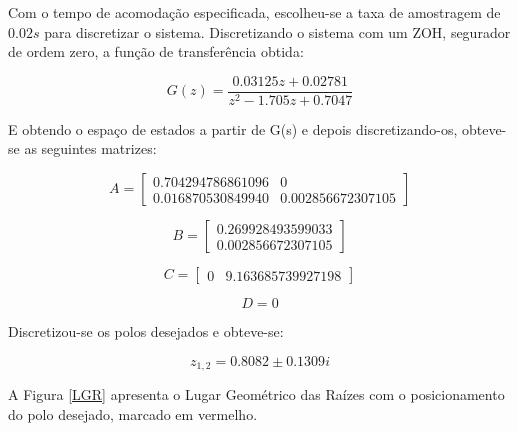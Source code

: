 \documentclass[conference,harvard,brazil,english]{sbatex}
\begin{document}
            Com o tempo de acomodação especificada, escolheu-se a taxa de amostragem de $0.02s$ para discretizar o sistema. Discretizando o sistema com um ZOH, segurador de ordem zero, a função de transferência obtida:
                
            \begin{equation}
                G(z) = \frac{0.03125 z + 0.02781}{z^2 - 1.705 z + 0.7047}
            \end{equation}
            
            E obtendo o espaço de estados a partir de G(s) e depois discretizando-os, obteve-se as seguintes matrizes:

            \begin{equation}
                A =
                \begin{bmatrix} 0.704294786861096 & 0
                            \\  0.016870530849940 & 0.002856672307105
                \end{bmatrix}
            \end{equation}
            
            \begin{equation}
                B = 
                \begin{bmatrix} 0.269928493599033
                            \\  0.002856672307105
                \end{bmatrix}
            \end{equation}
            
            \begin{equation}
                C = \begin{bmatrix} 0 & 9.163685739927198
                \end{bmatrix}
            \end{equation}
            
            \begin{equation}
                D = 0
            \end{equation}
                
            Discretizou-se os polos desejados e obteve-se:
            
            \begin{equation}
                z_{1,2} = 0.8082 \pm 0.1309i
            \end{equation}
            
            A Figura \ref{LGR} apresenta o Lugar Geométrico das Raízes com o posicionamento do polo desejado, marcado em vermelho.
            
\end{document}

